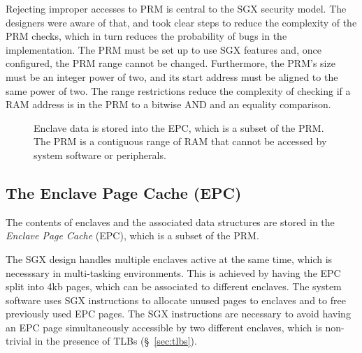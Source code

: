 Rejecting improper accesses to PRM is central to the SGX security model. The
designers were aware of that, and took clear steps to reduce the complexity of
the PRM checks, which in turn reduces the probability of bugs in the
implementation. The PRM must be set up to use SGX features and, once
configured, the PRM range cannot be changed. Furthermore, the PRM's size must
be an integer power of two, and its start address must be aligned to the same
power of two. The range restrictions reduce the complexity of checking if a RAM
address is in the PRM to a bitwise AND and an equality comparison.

\begin{figure}[hbt]
  \caption{
    Enclave data is stored into the EPC, which is a subset of the PRM. The
    PRM is a contiguous range of RAM that cannot be accessed by system software
    or peripherals.
  }
  \label{fig:sgx_epc}
\end{figure}


\subsection{The Enclave Page Cache (EPC)}


The contents of enclaves and the associated data structures are stored in the
\textit{Enclave Page Cache} (EPC), which is a subset of the PRM.

The SGX design handles multiple enclaves active at the same time, which is
necesssary in multi-tasking environments. This is achieved by having the EPC
split into 4kb pages, which can be associated to different enclaves. The system
software uses SGX instructions to allocate unused pages to enclaves and to free
previously used EPC pages. The SGX instructions are necessary to avoid having
an EPC page simultaneously accessible by two different enclaves, which is
non-trivial in the presence of TLBs (\S~\ref{sec:tlbs}).

